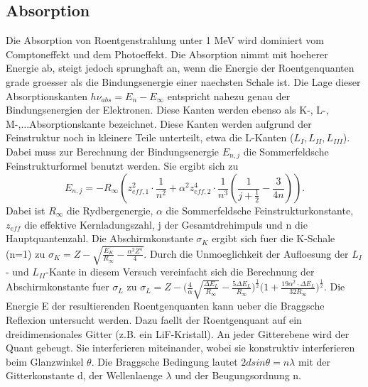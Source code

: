 \subsection{Absorption}
Die Absorption von Roentgenstrahlung unter 1 MeV wird dominiert vom Comptoneffekt und dem Photoeffekt. Die Absorption nimmt mit hoeherer Energie ab, steigt jedoch sprunghaft an, wenn die Energie der Roentgenquanten grade groesser als die Bindungsenergie einer naechsten Schale ist. Die Lage dieser Absorptionskanten $h\nu_{abs}=E_n-E_{\infty}$ entspricht nahezu genau der Bindungsenergien der Elektronen. Diese Kanten werden ebenso als K-, L-, M-,...Absorptionskante bezeichnet. Diese Kanten werden aufgrund der Feinstruktur noch in kleinere Teile unterteilt, etwa die L-Kanten ($L_I, L_{II}, L_{III}$). Dabei muss zur Berechnung der Bindungsenergie $E_{n,j}$ die Sommerfeldsche Feinstrukturformel benutzt werden. Sie ergibt sich zu 
\begin{equation*}
    E_{n,j}=-R_\infty(z^2_{eff,1}\cdot\frac{1}{n^2}+\alpha^2z^4_{eff,2}\cdot\frac{1}{n^3}(\frac{1}{j+\frac{1}{2}}-\frac{3}{4n})).
\end{equation*}
Dabei ist $R_\infty$ die Rydbergenergie, $\alpha$ die Sommerfeldsche Feinstrukturkonstante, $z_{eff}$ die effektive Kernladungszahl, j der Gesamtdrehimpuls und n die Hauptquantenzahl. Die Abschirmkonstante $\sigma_K$ ergibt sich fuer die K-Schale (n=1) zu $\sigma_K=Z-\sqrt{\frac{E_K}{R_\infty}-\frac{\alpha^2Z^4}{4}}$.
Durch die Unmoeglichkeit der Aufloesung der $L_I$- und $L_{II}$-Kante in diesem Versuch vereinfacht sich die Berechnung der Abschirmkonstante fuer $\sigma_L$ zu $\sigma_L=Z-\Bigg(\frac{4}{\alpha}\sqrt{\frac{\Delta E_L}{R_\infty}}-\frac{5\Delta E_L}{R_\infty}\Bigg)^{\frac{1}{2}}\Bigg(1+\frac{19\alpha^2\cdot\Delta E_L}{32R_\infty}\Bigg)^{\frac{1}{2}}$.
Die Energie E der resultierenden Roentgenquanten kann ueber die Braggsche Reflexion untersucht werden. Dazu faellt der Roentgenquant auf ein dreidimensionales Gitter (z.B. ein LiF-Kristall). An jeder Gitterebene wird der Quant gebeugt. Sie interferieren miteinander, wobei sie konstruktiv interferieren beim Glanzwinkel $\theta$. Die Braggsche Bedingung lautet $2dsin\theta=n\lambda$ mit der Gitterkonstante d, der Wellenlaenge $\lambda$ und der Beugungsordnung n.
